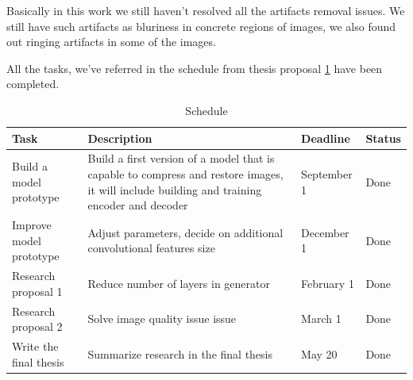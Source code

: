 Basically in this work we still haven't resolved all the artifacts removal issues. We still have such artifacts as bluriness in concrete regions of images, we also found out ringing artifacts in some of the images.

All the tasks, we've referred in the schedule from thesis proposal \ref{tab:schedule} have been completed.

\begin{table}
    \centering
    \caption{Schedule}
    \label{tab:schedule}
    \begin{tabular}{p{4cm}|p{8cm}|p{2cm}|p{2cm}}
        \hline
        \textbf{Task}           & \textbf{Description}                                                                                                                       & \textbf{Deadline} & \textbf{Status} \\
        \hline
        Build a model prototype & Build a first version of a model that is capable to compress and restore images, it will include building and training encoder and decoder & September 1       & Done            \\
        \hline
        Improve model prototype & Adjust parameters, decide on additional convolutional features size                                                                        & December 1        & Done            \\
        \hline
        Research proposal 1     & Reduce number of layers in generator                                                                                                       & February 1        & Done            \\
        \hline
        Research proposal 2     & Solve image quality issue issue                                                                                                            & March 1           & Done            \\
        \hline
        Write the final thesis  & Summarize research in the final thesis                                                                                                     & May 20            & Done            \\
        \hline
    \end{tabular}
\end{table}
